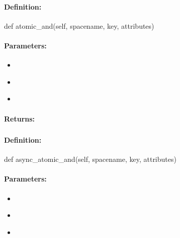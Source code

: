 \paragraph{Definition:}
\begin{pythoncode}
def atomic_and(self, spacename, key, attributes)
\end{pythoncode}

\paragraph{Parameters:}
\begin{itemize}[noitemsep]
\item {}\\

\item {}\\

\item {}\\

\end{itemize}

\paragraph{Returns:}


\pagebreak
\subsubsection{}
\label{api:python:async_atomic_and}


\paragraph{Definition:}
\begin{pythoncode}
def async_atomic_and(self, spacename, key, attributes)
\end{pythoncode}

\paragraph{Parameters:}
\begin{itemize}[noitemsep]
\item {}\\

\item {}\\

\item {}\\

\end{itemize}

